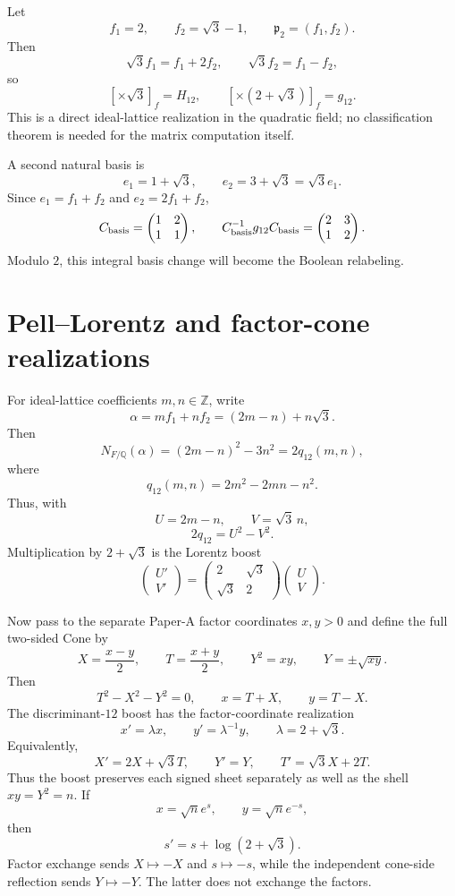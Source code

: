 \documentclass[11pt]{article}
\theoremstyle{remark}
\newcommand{\Q}{\mathbb Q}
\newcommand{\Z}{\mathbb Z}
\begin{document}
Let
\[
f_1=2,
\qquad f_2=\sqrt3-1,
\qquad \mathfrak p_2=(f_1,f_2).
\]
Then
\[
\sqrt3 f_1=f_1+2f_2,
\qquad
\sqrt3 f_2=f_1-f_2,
\]
so
\[
[\times\sqrt3]_f=H_{12},
\qquad
[\times(2+\sqrt3)]_f=g_{12}.
\]
This is a direct ideal-lattice realization in the quadratic field; no
classification theorem is needed for the matrix computation itself.

A second natural basis is
\[
e_1=1+\sqrt3,
\qquad e_2=3+\sqrt3=\sqrt3 e_1.
\]
Since $e_1=f_1+f_2$ and $e_2=2f_1+f_2$,
\[
C_{\rm basis}=\begin{pmatrix}1&2\\1&1\end{pmatrix},
\qquad
C_{\rm basis}^{-1}g_{12}C_{\rm basis}
=\begin{pmatrix}2&3\\1&2\end{pmatrix}.
\]
Modulo $2$, this integral basis change will become the Boolean relabeling.

\section{Pell--Lorentz and factor-cone realizations}

For ideal-lattice coefficients $m,n\in\Z$, write
\[
\alpha=mf_1+nf_2=(2m-n)+n\sqrt3.
\]
Then
\[
N_{F/\Q}(\alpha)
=(2m-n)^2-3n^2
=2q_{12}(m,n),
\]
where
\[
q_{12}(m,n)=2m^2-2mn-n^2.
\]
Thus, with
\[
U=2m-n,
\qquad V=\sqrt3\,n,
\]
\[
2q_{12}=U^2-V^2.
\]
Multiplication by $2+\sqrt3$ is the Lorentz boost
\[
\begin{pmatrix}U'\\V'\end{pmatrix}
=
\begin{pmatrix}2&\sqrt3\\\sqrt3&2\end{pmatrix}
\begin{pmatrix}U\\V\end{pmatrix}.
\]

Now pass to the separate Paper-A factor coordinates $x,y>0$ and define the
full two-sided Cone by
\[
X=\frac{x-y}{2},
\qquad T=\frac{x+y}{2},
\qquad Y^2=xy,
\qquad Y=\pm\sqrt{xy}.
\]
Then
\[
T^2-X^2-Y^2=0,
\qquad x=T+X,
\qquad y=T-X.
\]
The discriminant-$12$ boost has the factor-coordinate realization
\[
\boxed{x'=\lambda x,\qquad y'=\lambda^{-1}y,}
\qquad \lambda=2+\sqrt3.
\]
Equivalently,
\[
\boxed{
X'=2X+\sqrt3T,
\qquad Y'=Y,
\qquad T'=\sqrt3X+2T.}
\]
Thus the boost preserves each signed sheet separately as well as the shell
$xy=Y^2=n$.  If
\[
x=\sqrt n e^s,
\qquad y=\sqrt n e^{-s},
\]
then
\[
\boxed{s'=s+\log(2+\sqrt3).}
\]
Factor exchange sends $X\mapsto-X$ and $s\mapsto-s$, while the independent
cone-side reflection sends $Y\mapsto-Y$.  The latter does not exchange the
factors.
\end{document}
